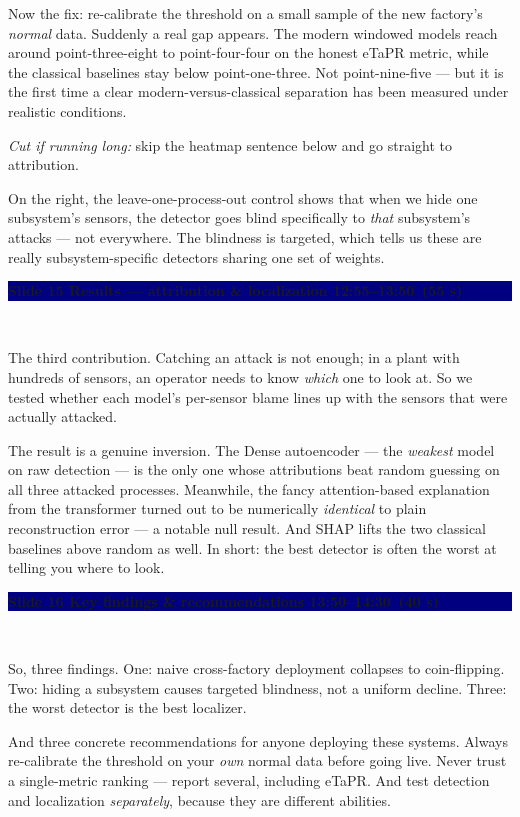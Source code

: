 \documentclass[11pt,a4paper]{article}
\newcommand{\slide}[5]{%
  \medskip
  \noindent\colorbox{navy}{\parbox{\dimexpr\textwidth-2\fboxsep}{%
    \color{white}\bfseries Slide #1 \;\textbar\; #2
    \hfill {\normalfont\color{lightbg}\small #4 \,(#5)}}}\\[2pt]
  \noindent{\color{teal}\small\textbf{Speaker: #3}}\par\vspace{2pt}%
}
\begin{document}
Now the fix: re-calibrate the threshold on a small sample of the new factory's \textit{normal} data. Suddenly a real gap appears. The modern windowed models reach around point-three-eight to point-four-four on the honest eTaPR metric, while the classical baselines stay below point-one-three. Not point-nine-five --- but it is the first time a clear modern-versus-classical separation has been measured under realistic conditions.

\begin{cut}\textit{Cut if running long:} skip the heatmap sentence below and go straight to attribution.\end{cut}
On the right, the leave-one-process-out control shows that when we hide one subsystem's sensors, the detector goes blind specifically to \textit{that} subsystem's attacks --- not everywhere. The blindness is targeted, which tells us these are really subsystem-specific detectors sharing one set of weights.

\slide{15}{Results --- attribution \& localization}{Galiya}{12:55--13:50}{55 s}
The third contribution. Catching an attack is not enough; in a plant with hundreds of sensors, an operator needs to know \textit{which} one to look at. So we tested whether each model's per-sensor blame lines up with the sensors that were actually attacked.

The result is a genuine inversion. The Dense autoencoder --- the \textit{weakest} model on raw detection --- is the only one whose attributions beat random guessing on all three attacked processes. Meanwhile, the fancy attention-based explanation from the transformer turned out to be numerically \textit{identical} to plain reconstruction error --- a notable null result. And SHAP lifts the two classical baselines above random as well. In short: the best detector is often the worst at telling you where to look.

\slide{16}{Key findings \& recommendations}{Galiya}{13:50--14:30}{40 s}
So, three findings. One: naive cross-factory deployment collapses to coin-flipping. Two: hiding a subsystem causes targeted blindness, not a uniform decline. Three: the worst detector is the best localizer.

And three concrete recommendations for anyone deploying these systems. Always re-calibrate the threshold on your \textit{own} normal data before going live. Never trust a single-metric ranking --- report several, including eTaPR. And test detection and localization \textit{separately}, because they are different abilities.
\end{document}
